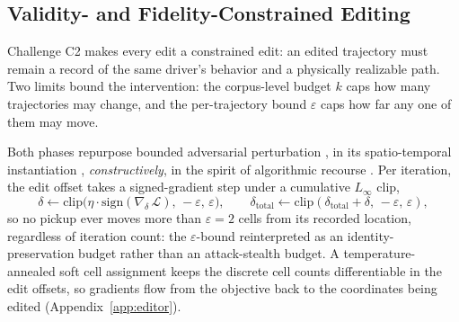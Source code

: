 \subsection{Validity- and Fidelity-Constrained Editing}\label{sec:phys-validity}

Challenge C2 makes every edit a constrained edit: an edited trajectory must
remain a record of the same driver's behavior and a physically realizable
path. Two limits bound the intervention: the corpus-level budget $k$ caps how
many trajectories may change, and the per-trajectory bound $\varepsilon$ caps
how far any one of them may move.

Both phases repurpose bounded adversarial
perturbation \cite{goodfellow2015fgsm,kurakin2017ifgsm}, in its
spatio-temporal instantiation \cite{hu2023stifgsm}, \emph{constructively},
in the spirit of algorithmic recourse
\cite{ustun2019recourse,wachter2018counterfactual}.
Per
iteration, the edit offset takes a signed-gradient step under a cumulative
$L_\infty$ clip,
\begin{equation}\label{eq:step}
\delta \leftarrow \mathrm{clip}\bigl(\eta \cdot
\mathrm{sign}(\nabla_{\delta}\,\mathcal{L}),\, -\varepsilon,\, \varepsilon\bigr),
\qquad
\delta_{\mathrm{total}} \leftarrow
\mathrm{clip}(\delta_{\mathrm{total}} + \delta,\, -\varepsilon,\, \varepsilon),
\end{equation}
so no pickup ever moves more than $\varepsilon = 2$ cells from its recorded
location, regardless of iteration count: the $\varepsilon$-bound
reinterpreted as an identity-preservation budget rather than an attack-stealth
budget. A temperature-annealed soft cell assignment keeps the discrete cell
counts differentiable in the edit offsets, so gradients flow from the
objective back to the coordinates being edited (Appendix~\ref{app:editor}).

